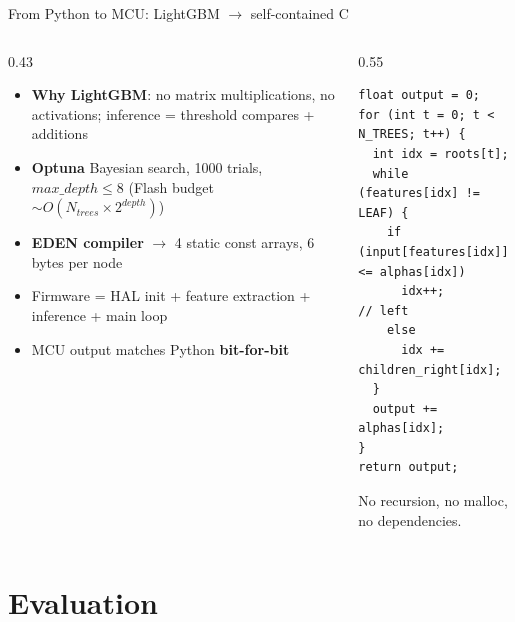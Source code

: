 \documentclass[11pt,aspectratio=169]{beamer}
\begin{document}
\begin{frame}[fragile]{From Python to MCU: LightGBM $\rightarrow$ self-contained C}
  \begin{columns}[T]
    \begin{column}{0.43\textwidth}
      \begin{itemize}
        \item \textbf{Why LightGBM}: no matrix multiplications, no activations;
              inference = threshold compares + additions
        \item \textbf{Optuna} Bayesian search, 1000 trials, $max\_depth \le 8$
              (Flash budget $\sim O(N_{trees} \times 2^{depth})$)
        \item \textbf{EDEN compiler} $\rightarrow$ 4 static const arrays,
              6 bytes per node
        \item Firmware = HAL init + feature extraction + inference + main loop
        \item MCU output matches Python \textbf{bit-for-bit}
      \end{itemize}
    \end{column}
    \begin{column}{0.55\textwidth}
      {\footnotesize
      \begin{verbatim}
float output = 0;
for (int t = 0; t < N_TREES; t++) {
  int idx = roots[t];
  while (features[idx] != LEAF) {
    if (input[features[idx]] <= alphas[idx])
      idx++;                 // left
    else
      idx += children_right[idx];
  }
  output += alphas[idx];
}
return output;
      \end{verbatim}}
      No recursion, no malloc, no dependencies.
    \end{column}
  \end{columns}
\end{frame}

\section{Evaluation}
\end{document}
